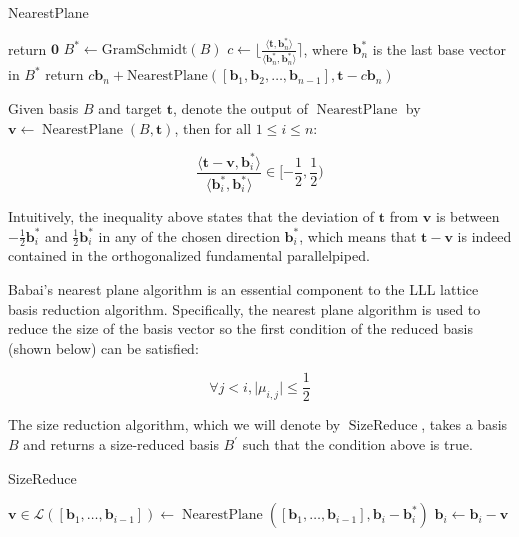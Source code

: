 \begin{algorithm}
\caption{NearestPlane}
\begin{algorithmic}[1]
        \State return $\mathbf{0}$
    \EndIf 
    \State $B^\ast \leftarrow \text{GramSchmidt}(B)$
    \State $c \leftarrow \lfloor \frac{\langle\mathbf{t}, \mathbf{b}_n^\ast\rangle}{\langle\mathbf{b}_n^\ast, \mathbf{b}_n^\ast\rangle} \rceil$, where $\mathbf{b}_n^\ast$ is the last base vector in $B^\ast$
    \State return $c\mathbf{b}_n + \text{NearestPlane}([\mathbf{b}_1, \mathbf{b}_2, \ldots, \mathbf{b}_{n-1}], \mathbf{t} - c\mathbf{b}_n)$
\end{algorithmic}
\end{algorithm}


\begin{theorem}
    Given basis $B$ and target $\mathbf{t}$, denote the output of $\operatorname{NearestPlane}$ by $\mathbf{v} \leftarrow \operatorname{NearestPlane}(B, \mathbf{t})$, then for all $1 \leq i \leq n$:

    $$
    \frac{
        \langle
            \mathbf{t} - \mathbf{v}, \mathbf{b}_i^\ast
        \rangle
    }{
        \langle
            \mathbf{b}_i^\ast, \mathbf{b}_i^\ast
        \rangle
    } 
    \in [-\frac{1}{2}, \frac{1}{2})
        $$
    \end{theorem}

Intuitively, the inequality above states that the deviation of $\mathbf{t}$ from $\mathbf{v}$ is between $-\frac{1}{2}\mathbf{b}_i^\ast$ and $\frac{1}{2}\mathbf{b}_i^\ast$ in any of the chosen direction $\mathbf{b}_i^\ast$, which means that $\mathbf{t} - \mathbf{v}$ is indeed contained in the orthogonalized fundamental parallelpiped.

Babai's nearest plane algorithm is an essential component to the LLL lattice basis reduction algorithm. Specifically, the nearest plane algorithm is used to reduce the size of the basis vector so the first condition of the reduced basis (shown below) can be satisfied:

$$
\forall j<i, \vert\mu_{i, j}\vert \leq \frac{1}{2}
$$

The size reduction algorithm, which we will denote by $\operatorname{SizeReduce}$, takes a basis $B$ and returns a size-reduced basis $B^\prime$ such that the condition above is true.

\begin{algorithm}
\caption{SizeReduce}
\begin{algorithmic}[1]
        \State $\mathbf{v} \in \mathcal{L}([\mathbf{b}_1, \ldots, \mathbf{b}_{i-1}]) \leftarrow \operatorname{NearestPlane}([\mathbf{b}_1, \ldots, \mathbf{b}_{i-1}], \mathbf{b}_i - \mathbf{b}_i^\ast)$
        \State $\mathbf{b}_i \leftarrow \mathbf{b}_i - \mathbf{v}$
    \EndFor
\end{algorithmic}
\end{algorithm}

